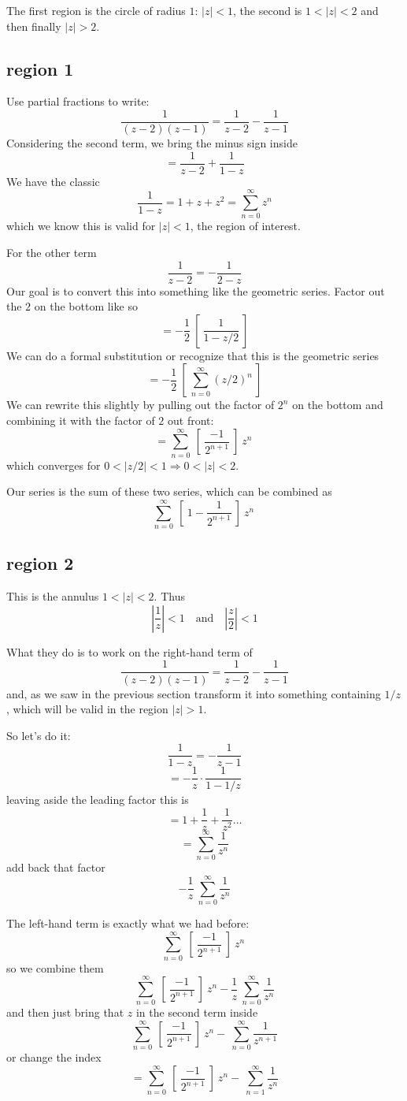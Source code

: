 \documentclass[11pt, oneside]{article}   	%
\begin{document}
The first region is the circle of radius $1$:  $|z| < 1$, the second is $1 < |z| < 2$ and then finally $|z| > 2$.

\subsection*{region 1}
Use partial fractions to write:
\[ \frac{1}{(z-2)(z-1)} = \frac{1}{z-2} - \frac{1}{z-1} \]
Considering the second term, we bring the minus sign inside
\[ = \frac{1}{z-2} + \frac{1}{1-z} \]
We have the classic
\[ \frac{1}{1-z} = 1 + z + z^2 = \sum_{n=0}^{\infty} z^n \]
which we know this is valid for $|z| < 1$, the region of interest.

For the other term
\[ \frac{1}{z - 2} = - \frac{1}{2 - z} \]
Our goal is to convert this into something like the geometric series.  Factor out the $2$ on the bottom like so
\[ = - \frac{1}{2} \ [ \  \frac{1}{1 - z/2} \ ]  \]
We can do a formal substitution or recognize that this is the geometric series 
\[ = - \frac{1}{2} \ [ \   \sum_{n=0}^{\infty} (z/2)^n \ ]  \]
We can rewrite this slightly by pulling out the factor of $2^n$ on the bottom and combining it with the factor of $2$ out front:
\[ = \sum_{n=0}^{\infty} \ [ \ \frac{-1}{2^{n+1}} \ ] \  z^n \  \]
which converges for $0 < |z/2| < 1 \Rightarrow 0 < |z| < 2$.

Our series is the sum of these two series, which can be combined as
\[ \sum_{n=0}^{\infty} \ [ \ 1 - \frac{1}{2^{n+1}} \ ] \  z^n \  \]

\subsection*{region 2}
This is the annulus $1 < |z| < 2$.  Thus
\[ | \frac{1}{z} | < 1 \  \ \ \text{ and } \ \ \  |\frac{z}{2} | < 1 \]

What they do is to work on the right-hand term of
\[ \frac{1}{(z-2)(z-1)} = \frac{1}{z-2} - \frac{1}{z-1} \]
and, as we saw in the previous section transform it into something containing $1/z$, which will be valid in the region $|z| > 1$.

So let's do it:
\[ \frac{1}{1 - z} = - \frac{1}{z - 1}  \]
\[ = - \frac{1}{z} \cdot \frac{1}{1 - 1/z}  \]
leaving aside the leading factor this is
\[ = 1 + \frac{1}{z} + \frac{1}{z^2} \dots \]
\[ = \sum_{n=0}^{\infty} \frac{1}{z^n} \]
add back that factor
\[ -\frac{1}{z} \ \sum_{n=0}^{\infty} \frac{1}{z^n} \]

The left-hand term is exactly what we had before:
\[ \sum_{n=0}^{\infty} \ [ \ \frac{-1}{2^{n+1}} \ ] \  z^n \  \]
so we combine them
\[ \sum_{n=0}^{\infty} \ [ \ \frac{-1}{2^{n+1}} \ ] \  z^n -\frac{1}{z} \ \sum_{n=0}^{\infty} \frac{1}{z^n} \]
and then just bring that $z$ in the second term inside
\[ \sum_{n=0}^{\infty} \ [ \ \frac{-1}{2^{n+1}} \ ] \  z^n - \ \sum_{n=0}^{\infty} \frac{1}{z^{n+1}} \]
or change the index
\[ = \sum_{n=0}^{\infty} \ [ \ \frac{-1}{2^{n+1}} \ ] \  z^n - \ \sum_{n=1}^{\infty} \frac{1}{z^{n}} \]
\end{document}
